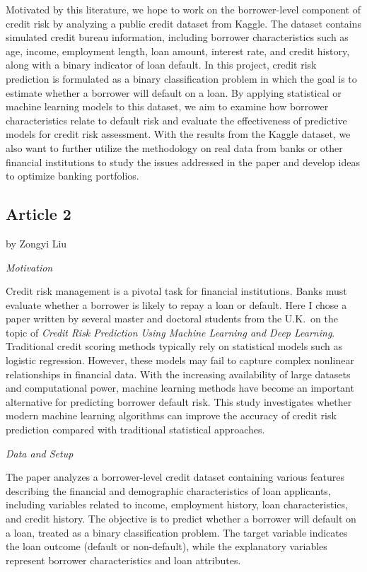 \documentclass[letterpaper]{article}
\begin{document}
	Motivated by this literature, we hope to work on the borrower-level component of credit risk by analyzing a public credit dataset from Kaggle. The dataset contains simulated credit bureau information, including borrower characteristics such as age, income, employment length, loan amount, interest rate, and credit history, along with a binary indicator of loan default. In this project, credit risk prediction is formulated as a binary classification problem in which the goal is to estimate whether a borrower will default on a loan. By applying statistical or machine learning models to this dataset, we aim to examine how borrower characteristics relate to default risk and evaluate the effectiveness of predictive models for credit risk assessment. With the results from the Kaggle dataset, we also want to further utilize the methodology on real data from banks or other financial institutions to study the issues addressed in the paper and develop ideas to optimize banking portfolios.
	
	
	\subsection{Article 2}
	
	{\color{deepred} by Zongyi Liu}
	
	
	\textit{Motivation}
	
	Credit risk management is a pivotal task for financial institutions. Banks must evaluate whether a borrower is likely to repay a loan or default. Here I chose a paper written by several master and doctoral students from the U.K.\ on the topic of \textit{Credit Risk Prediction Using Machine Learning and Deep Learning}. Traditional credit scoring methods typically rely on statistical models such as logistic regression. However, these models may fail to capture complex nonlinear relationships in financial data. With the increasing availability of large datasets and computational power, machine learning methods have become an important alternative for predicting borrower default risk. This study investigates whether modern machine learning algorithms can improve the accuracy of credit risk prediction compared with traditional statistical approaches.
	
	\medskip
	
	\textit{Data and Setup}
	
	The paper analyzes a borrower-level credit dataset containing various features describing the financial and demographic characteristics of loan applicants, including variables related to income, employment history, loan characteristics, and credit history. The objective is to predict whether a borrower will default on a loan, treated as a binary classification problem. The target variable indicates the loan outcome (default or non-default), while the explanatory variables represent borrower characteristics and loan attributes.
	
\end{document}

